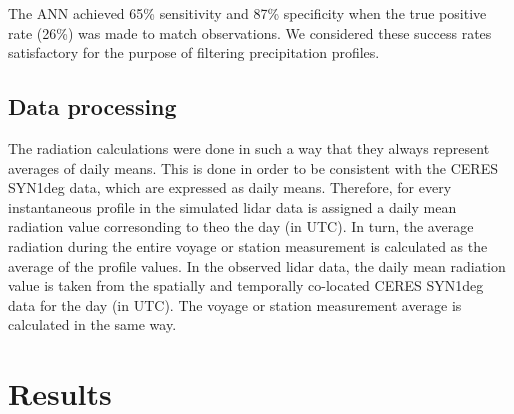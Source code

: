 \documentclass[12pt,a4paper]{article}
\begin{document}
The ANN achieved 65\% sensitivity and 87\% speciﬁcity when the true positive
rate (26\%) was made to match observations. We considered these success rates
satisfactory for the purpose of filtering precipitation profiles.

\subsection{Data processing}

The radiation calculations were done in such a way that they always represent
averages of daily means. This is done in order to be consistent with the CERES
SYN1deg data, which are expressed as daily means. Therefore, for every
instantaneous profile in the simulated lidar data is assigned a daily mean
radiation value corresonding to theo the day (in UTC). In turn, the average
radiation during the entire voyage or station measurement is calculated as the
average of the profile values. In the observed lidar data, the daily mean
radiation value is taken from the spatially and temporally co-located CERES
SYN1deg data for the day (in UTC). The voyage or station measurement average
is calculated in the same way.

\section{Results}
\label{sec:results}
\end{document}
